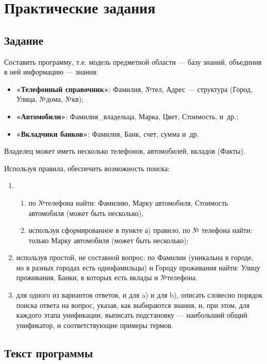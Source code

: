 \chapter{Практические задания}

\vspace{-0.5cm}
\section{Задание}
\vspace{-0.5cm}

Составить программу, т.е. модель предметной области --- базу знаний, объединив в
ней информацию --- знания:

\begin{itemize}
    \item \textbf{«Телефонный справочник»}: Фамилия, №тел, Адрес --- структура
        (Город, Улица, №дома, №кв);
    \item \textbf{«Автомобили»}: Фамилия\_владельца, Марка, Цвет, Стоимость,
        и~др.;
    \item \textbf{«Вкладчики банков»}: Фамилия, Банк, счет, сумма и~др.
\end{itemize}

Владелец может иметь несколько телефонов, автомобилей, вкладов \mbox{(Факты)}.

Используя правила, обеспечить возможность поиска:
\begin{enumerate}[label=\arabic*)]
    \item \begin{enumerate}[label=\alph*)]
        \item по №телефона найти: Фамилию, Марку автомобиля, Стоимость
            автомобиля (может быть несколько),
        \item используя сформированное в пункте а) правило, по № телефона найти:
            только Марку автомобиля (может быть несколько);
    \end{enumerate}
    \item используя простой, не составной вопрос: по Фамилии (уникальна в
        городе, но в разных городах есть однофамильцы) и Городу проживания
        найти: Улицу проживания, Банки, в которых есть вклады и №телефона.
    \item для одного из вариантов ответов, и для a) и для b), описать словесно
        порядок поиска ответа на вопрос, указав, как выбираются знания, и, при
        этом, для каждого этапа унификации, выписать подстановку --- наибольший
        общий унификатор, и соответствующие примеры термов.
\end{enumerate}
\vspace{-0.5cm}
\section{Текст программы}
\vspace{-0.5cm}


